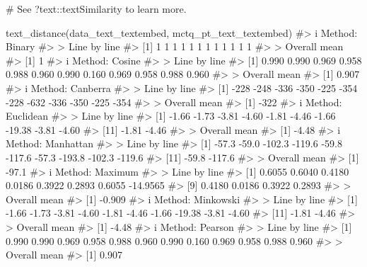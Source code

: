 \documentclass[
  12pt,
  a4paper,
  oneside]{tesesusp}
\newenvironment{Shaded}{\begin{snugshade}}{\end{snugshade}}
\newcommand{\CommentTok}[1]{\textcolor[rgb]{0.37,0.37,0.37}{#1}}
\newcommand{\FunctionTok}[1]{\textcolor[rgb]{0.28,0.35,0.67}{#1}}
\newcommand{\NormalTok}[1]{\textcolor[rgb]{0.00,0.23,0.31}{#1}}
\begin{document}
\begin{Shaded}
\begin{Highlighting}[numbers=left,,]
\CommentTok{\# See \textasciigrave{}?text::textSimilarity\textasciigrave{} to learn more.}

\FunctionTok{text\_distance}\NormalTok{(data\_text\_textembed, mctq\_pt\_text\_textembed)}
\CommentTok{\#\textgreater{} i Method: Binary}
\CommentTok{\#\textgreater{} \textgreater{} Line by line}
\CommentTok{\#\textgreater{}  [1] 1 1 1 1 1 1 1 1 1 1 1 1}
\CommentTok{\#\textgreater{} \textgreater{} Overall mean}
\CommentTok{\#\textgreater{} [1] 1}
\CommentTok{\#\textgreater{} i Method: Cosine}
\CommentTok{\#\textgreater{} \textgreater{} Line by line}
\CommentTok{\#\textgreater{}  [1] 0.990 0.990 0.969 0.958 0.988 0.960 0.990 0.160 0.969 0.958 0.988 0.960}
\CommentTok{\#\textgreater{} \textgreater{} Overall mean}
\CommentTok{\#\textgreater{} [1] 0.907}
\CommentTok{\#\textgreater{} i Method: Canberra}
\CommentTok{\#\textgreater{} \textgreater{} Line by line}
\CommentTok{\#\textgreater{}  [1] {-}228 {-}248 {-}336 {-}350 {-}225 {-}354 {-}228 {-}632 {-}336 {-}350 {-}225 {-}354}
\CommentTok{\#\textgreater{} \textgreater{} Overall mean}
\CommentTok{\#\textgreater{} [1] {-}322}
\CommentTok{\#\textgreater{} i Method: Euclidean}
\CommentTok{\#\textgreater{} \textgreater{} Line by line}
\CommentTok{\#\textgreater{}  [1]  {-}1.66  {-}1.73  {-}3.81  {-}4.60  {-}1.81  {-}4.46  {-}1.66 {-}19.38  {-}3.81  {-}4.60}
\CommentTok{\#\textgreater{} [11]  {-}1.81  {-}4.46}
\CommentTok{\#\textgreater{} \textgreater{} Overall mean}
\CommentTok{\#\textgreater{} [1] {-}4.48}
\CommentTok{\#\textgreater{} i Method: Manhattan}
\CommentTok{\#\textgreater{} \textgreater{} Line by line}
\CommentTok{\#\textgreater{}  [1]  {-}57.3  {-}59.0 {-}102.3 {-}119.6  {-}59.8 {-}117.6  {-}57.3 {-}193.8 {-}102.3 {-}119.6}
\CommentTok{\#\textgreater{} [11]  {-}59.8 {-}117.6}
\CommentTok{\#\textgreater{} \textgreater{} Overall mean}
\CommentTok{\#\textgreater{} [1] {-}97.1}
\CommentTok{\#\textgreater{} i Method: Maximum}
\CommentTok{\#\textgreater{} \textgreater{} Line by line}
\CommentTok{\#\textgreater{}  [1]   0.6055   0.6040   0.4180   0.0186   0.3922   0.2893   0.6055 {-}14.9565}
\CommentTok{\#\textgreater{}  [9]   0.4180   0.0186   0.3922   0.2893}
\CommentTok{\#\textgreater{} \textgreater{} Overall mean}
\CommentTok{\#\textgreater{} [1] {-}0.909}
\CommentTok{\#\textgreater{} i Method: Minkowski}
\CommentTok{\#\textgreater{} \textgreater{} Line by line}
\CommentTok{\#\textgreater{}  [1]  {-}1.66  {-}1.73  {-}3.81  {-}4.60  {-}1.81  {-}4.46  {-}1.66 {-}19.38  {-}3.81  {-}4.60}
\CommentTok{\#\textgreater{} [11]  {-}1.81  {-}4.46}
\CommentTok{\#\textgreater{} \textgreater{} Overall mean}
\CommentTok{\#\textgreater{} [1] {-}4.48}
\CommentTok{\#\textgreater{} i Method: Pearson}
\CommentTok{\#\textgreater{} \textgreater{} Line by line}
\CommentTok{\#\textgreater{}  [1] 0.990 0.990 0.969 0.958 0.988 0.960 0.990 0.160 0.969 0.958 0.988 0.960}
\CommentTok{\#\textgreater{} \textgreater{} Overall mean}
\CommentTok{\#\textgreater{} [1] 0.907}
\end{Highlighting}
\end{Shaded}
\end{document}
